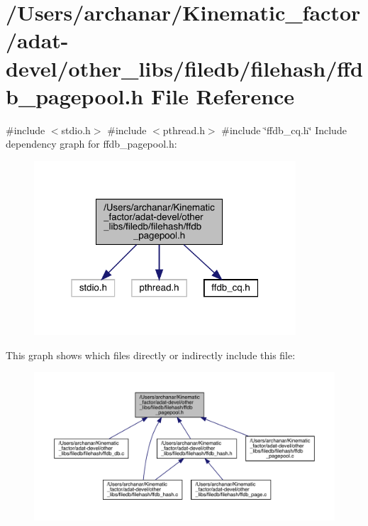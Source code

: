 \hypertarget{adat-devel_2other__libs_2filedb_2filehash_2ffdb__pagepool_8h}{}\section{/\+Users/archanar/\+Kinematic\+\_\+factor/adat-\/devel/other\+\_\+libs/filedb/filehash/ffdb\+\_\+pagepool.h File Reference}
\label{adat-devel_2other__libs_2filedb_2filehash_2ffdb__pagepool_8h}
{\ttfamily \#include $<$stdio.\+h$>$}\newline
{\ttfamily \#include $<$pthread.\+h$>$}\newline
{\ttfamily \#include \char`\"{}ffdb\+\_\+cq.\+h\char`\"{}}\newline
Include dependency graph for ffdb\+\_\+pagepool.\+h\+:
\nopagebreak
\begin{figure}[H]
\begin{center}
\leavevmode
\includegraphics[width=277pt]{dd/d67/adat-devel_2other__libs_2filedb_2filehash_2ffdb__pagepool_8h__incl}
\end{center}
\end{figure}
This graph shows which files directly or indirectly include this file\+:
\nopagebreak
\begin{figure}[H]
\begin{center}
\leavevmode
\includegraphics[width=350pt]{d9/d85/adat-devel_2other__libs_2filedb_2filehash_2ffdb__pagepool_8h__dep__incl}
\end{center}
\end{figure}
